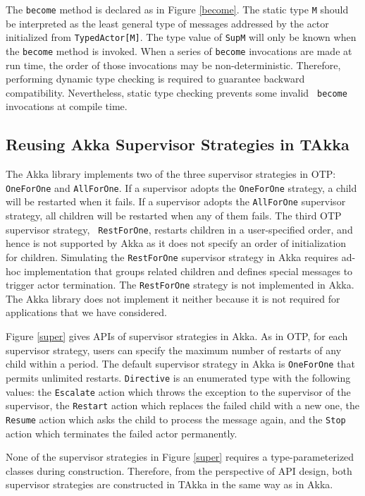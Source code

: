 The {\tt become} method is declared as in Figure \ref{become}.  The
static type {\tt M} should be interpreted as the least general type of
messages addressed by the actor initialized from {\tt TypedActor[M]}.  The
type value of {\tt SupM} will only be known when the {\tt become} method 
is invoked.  When a series of {\tt become} invocations are made at run 
time, the order of those invocations may be non-deterministic.  Therefore, 
performing dynamic type checking is required to guarantee backward
compatibility.  Nevertheless, static type checking prevents some invalid {\tt 
become} invocations at compile time.

\subsection{Reusing Akka Supervisor Strategies in TAkka}
\label{supervision}

The Akka library implements two of the three supervisor strategies in OTP:
{\tt OneForOne} and {\tt AllForOne}.  If a supervisor adopts the
{\tt OneForOne} strategy, a child will be restarted when it fails.  If a 
supervisor adopts the {\tt AllForOne} supervisor strategy, all children will 
be restarted when any of them fails.  The third OTP supervisor strategy, {\tt
RestForOne}, restarts children in a user-specified order, and hence is not
supported by Akka as it does not specify an order of initialization for
children.  Simulating the {\tt RestForOne} supervisor strategy in Akka
requires ad-hoc implementation that groups related children and defines special
messages to trigger actor termination.  The {\tt RestForOne} strategy is not 
implemented in Akka.  The Akka library does not implement it neither because it 
is not required for applications that we have considered.

Figure \ref{super} gives APIs of supervisor strategies in Akka.  As in OTP, for
each supervisor strategy, users can specify the maximum number of
restarts of any child within a period.  The default 
supervisor strategy in Akka is {\tt OneForOne} that permits unlimited 
restarts.  {\tt Directive} is an enumerated type with the following values: the
{\tt Escalate} action which throws the exception to the supervisor of the 
supervisor, the {\tt Restart} action which replaces the failed child with a new 
one, the {\tt Resume} action which asks the child to process the message again, 
and the {\tt Stop} action which terminates the failed actor permanently.

None of the supervisor strategies in Figure \ref{super} requires a 
type-parameterized classes during construction.  Therefore, from the perspective 
of API design, both supervisor strategies are constructed in TAkka in the same 
way as in Akka.


